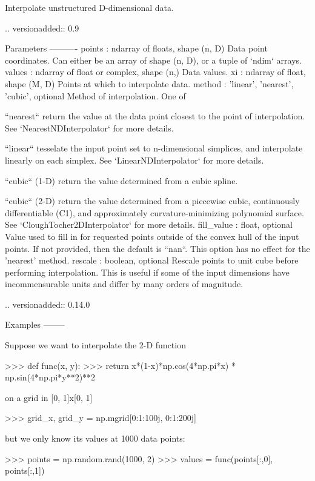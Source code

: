 \begin{DoxyVerb}Interpolate unstructured D-dimensional data.

.. versionadded:: 0.9

Parameters
----------
points : ndarray of floats, shape (n, D)
    Data point coordinates. Can either be an array of
    shape (n, D), or a tuple of `ndim` arrays.
values : ndarray of float or complex, shape (n,)
    Data values.
xi : ndarray of float, shape (M, D)
    Points at which to interpolate data.
method : {'linear', 'nearest', 'cubic'}, optional
    Method of interpolation. One of

    ``nearest``
      return the value at the data point closest to
      the point of interpolation.  See `NearestNDInterpolator` for
      more details.

    ``linear``
      tesselate the input point set to n-dimensional
      simplices, and interpolate linearly on each simplex.  See
      `LinearNDInterpolator` for more details.

    ``cubic`` (1-D)
      return the value determined from a cubic
      spline.

    ``cubic`` (2-D)
      return the value determined from a
      piecewise cubic, continuously differentiable (C1), and
      approximately curvature-minimizing polynomial surface. See
      `CloughTocher2DInterpolator` for more details.
fill_value : float, optional
    Value used to fill in for requested points outside of the
    convex hull of the input points.  If not provided, then the
    default is ``nan``. This option has no effect for the
    'nearest' method.
rescale : boolean, optional
    Rescale points to unit cube before performing interpolation.
    This is useful if some of the input dimensions have
    incommensurable units and differ by many orders of magnitude.

    .. versionadded:: 0.14.0


Examples
--------

Suppose we want to interpolate the 2-D function

>>> def func(x, y):
>>>     return x*(1-x)*np.cos(4*np.pi*x) * np.sin(4*np.pi*y**2)**2

on a grid in [0, 1]x[0, 1]

>>> grid_x, grid_y = np.mgrid[0:1:100j, 0:1:200j]

but we only know its values at 1000 data points:

>>> points = np.random.rand(1000, 2)
>>> values = func(points[:,0], points[:,1])


\end{DoxyVerb}
